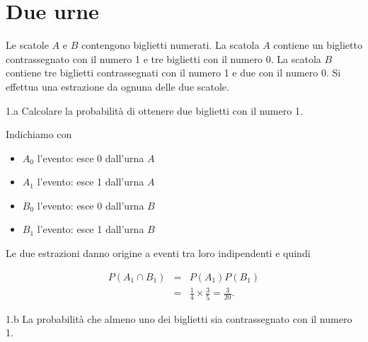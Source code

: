 \documentclass[
  11pt,
]{book}
\providecommand{\tightlist}{%
  \setlength{\itemsep}{0pt}\setlength{\parskip}{0pt}}
\theoremstyle{mytheoremstyle}
\theoremstyle{mydefstyle}
\newenvironment{sol}
  {
  \begin{tcolorbox}[enhanced,breakable,arc=0.1mm,boxrule=1pt,colback=white,colframe=iblue,
  title=\bf \fontfamily{lmss}\selectfont \hspace{.5 cm} Soluzione,drop fuzzy shadow]

}{
\end{tcolorbox}
  }
\begin{document}
\section{Due urne}\label{due-urne}

Le scatole \(A\) e \(B\) contengono biglietti numerati.
La scatola \(A\) contiene un biglietto contrassegnato
con il numero 1 e tre biglietti con il numero 0.
La scatola \(B\) contiene tre biglietti contrassegnati
con il numero 1 e due con il numero 0.
Si effettua una estrazione da ognuna delle due scatole.

1.a Calcolare la probabilità di ottenere due biglietti
con il numero 1.

\begin{sol}
Indichiamo con

\begin{itemize}
\tightlist
\item
  \(A_0\) l'evento: esce 0 dall'urna \(A\)
\item
  \(A_1\) l'evento: esce 1 dall'urna \(A\)
\item
  \(B_0\) l'evento: esce 0 dall'urna \(B\)
\item
  \(B_1\) l'evento: esce 1 dall'urna \(B\)
\end{itemize}

Le due estrazioni danno origine a eventi tra loro
indipendenti e quindi

\begin{eqnarray*}
    P(A_1\cap B_1)
&=& P(A_1) P(B_1) \\
&=& \frac{1}{4} \times \frac{3}{5} = \frac{3}{20}.
\end{eqnarray*}

\end{sol}

1.b La probabilità che almeno uno dei biglietti sia
contrassegnato con il numero 1.
\end{document}
